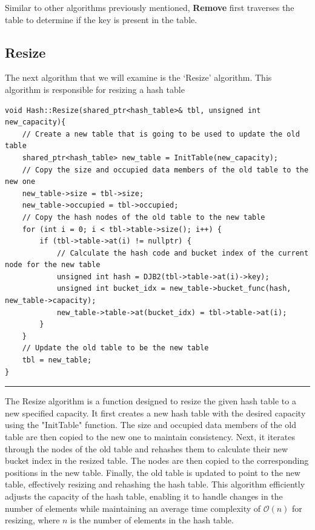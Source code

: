 \documentclass[a4paper,9pt]{article}
\newcommand{\horizontalline}{\noindent \rule{\textwidth}{0.5pt}\par}
\begin{document}
\noindent Similar to other algorithms previously mentioned, \textbf{Remove} first traverses the table to determine if the key is present in the table.

\subsection*{Resize}

The next algorithm that we will examine is the `Resize' algorithm. This algorithm is responsible for resizing a hash table 

\begin{highlight}

\begin{verbatim}
void Hash::Resize(shared_ptr<hash_table>& tbl, unsigned int new_capacity){
    // Create a new table that is going to be used to update the old table
    shared_ptr<hash_table> new_table = InitTable(new_capacity);
    // Copy the size and occupied data members of the old table to the new one
    new_table->size = tbl->size;
    new_table->occupied = tbl->occupied;
    // Copy the hash nodes of the old table to the new table
    for (int i = 0; i < tbl->table->size(); i++) {
        if (tbl->table->at(i) != nullptr) {
            // Calculate the hash code and bucket index of the current node for the new table
            unsigned int hash = DJB2(tbl->table->at(i)->key);
            unsigned int bucket_idx = new_table->bucket_func(hash, new_table->capacity);
            new_table->table->at(bucket_idx) = tbl->table->at(i);
        }
    }
    // Update the old table to be the new table
    tbl = new_table;
}
\end{verbatim}

\horizontalline

The Resize algorithm is a function designed to resize the given hash table to a new specified capacity. It first creates a new hash table with the desired capacity using the "InitTable" function. The size 
and occupied data members of the old table are then copied to the new one to maintain consistency. Next, it iterates through the nodes of the old table and rehashes them to calculate their new bucket index 
in the resized table. The nodes are then copied to the corresponding positions in the new table. Finally, the old table is updated to point to the new table, effectively resizing and rehashing the hash table. 
This algorithm efficiently adjusts the capacity of the hash table, enabling it to handle changes in the number of elements while maintaining an average time complexity of $\mathcal{O}(n)$ for resizing, where 
$n$ is the number of elements in the hash table.

\end{highlight}
\end{document}
